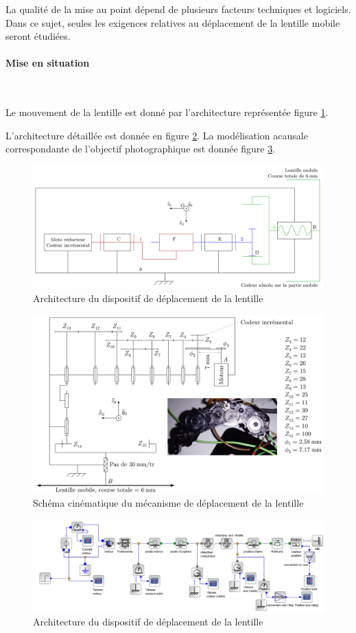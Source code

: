 La qualité de la mise au point dépend de plusieurs facteurs techniques et logiciels. Dans ce sujet, seules les exigences relatives au déplacement de la lentille mobile seront étudiées.

\paragraph{Mise en situation} ~\

Le mouvement de la lentille est donné par l'architecture représentée figure \ref{img03}.

L'architecture détaillée est donnée en figure \ref{img04}. La modélisation acausale correspondante de l'objectif photographique est donnée figure \ref{img05}.

\newpage

\begin{figure}[!h]
\centering\includegraphics[width=0.82\linewidth]{img/figure_03}
 \caption{Architecture du dispositif de déplacement de la lentille}
 \label{img03}
\end{figure}

\begin{figure}[!h]
\centering\includegraphics[width=0.85\linewidth]{img/figure_04}
 \caption{Schéma cinématique du mécanisme de déplacement de la lentille}
 \label{img04}
\end{figure}

\begin{figure}[!h]
\centering\includegraphics[width=0.9\linewidth]{img/figure_05}
 \caption{Architecture du dispositif de déplacement de la lentille}
 \label{img05}
\end{figure}

